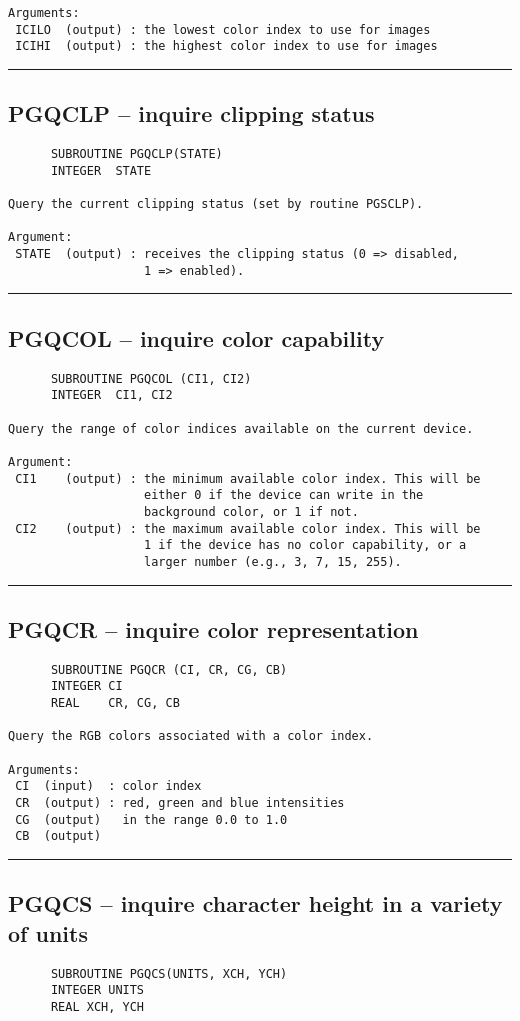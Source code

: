 {\begin{verbatim}
Arguments:
 ICILO  (output) : the lowest color index to use for images
 ICIHI  (output) : the highest color index to use for images
\end{verbatim}
\hrule


\subsection*{PGQCLP -- inquire clipping status }
\begin{verbatim}
      SUBROUTINE PGQCLP(STATE)
      INTEGER  STATE

Query the current clipping status (set by routine PGSCLP).

Argument:
 STATE  (output) : receives the clipping status (0 => disabled,
                   1 => enabled).
\end{verbatim}
\hrule


\subsection*{PGQCOL -- inquire color capability }
\begin{verbatim}
      SUBROUTINE PGQCOL (CI1, CI2)
      INTEGER  CI1, CI2

Query the range of color indices available on the current device.

Argument:
 CI1    (output) : the minimum available color index. This will be
                   either 0 if the device can write in the
                   background color, or 1 if not.
 CI2    (output) : the maximum available color index. This will be
                   1 if the device has no color capability, or a
                   larger number (e.g., 3, 7, 15, 255).
\end{verbatim}
\hrule


\subsection*{PGQCR -- inquire color representation }
\begin{verbatim}
      SUBROUTINE PGQCR (CI, CR, CG, CB)
      INTEGER CI
      REAL    CR, CG, CB

Query the RGB colors associated with a color index.

Arguments:
 CI  (input)  : color index
 CR  (output) : red, green and blue intensities
 CG  (output)   in the range 0.0 to 1.0
 CB  (output)
\end{verbatim}
\hrule


\subsection*{PGQCS -- inquire character height in a variety of units }
\begin{verbatim}
      SUBROUTINE PGQCS(UNITS, XCH, YCH)
      INTEGER UNITS
      REAL XCH, YCH


\end{verbatim}}
